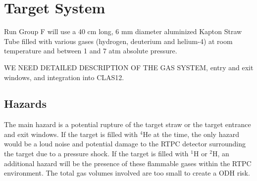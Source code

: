 \section{Target System}

Run Group F will use a 40 cm long, 6 mm diameter aluminized Kapton Straw Tube
filled with various gases (hydrogen, deuterium and helium-4)
 at room temperature and between 1 and 7 atm absolute pressure.

WE NEED DETAILED DESCRIPTION OF THE GAS SYSTEM, entry and exit windows, and integration
into CLAS12.

%   
               
\subsection{Hazards} 

The main hazard is a potential rupture of the target straw or the target entrance and exit windows. 
If the target is filled with $^4$He at the time, the only hazard would be a loud noise and potential damage
to the RTPC detector surrounding the target due to a pressure shock. If the target is filled with
$^1$H or $^2$H, an additional hazard will be the presence of these flammable gases within the RTPC
environment. The total gas volumes involved are too small to create a ODH risk.

